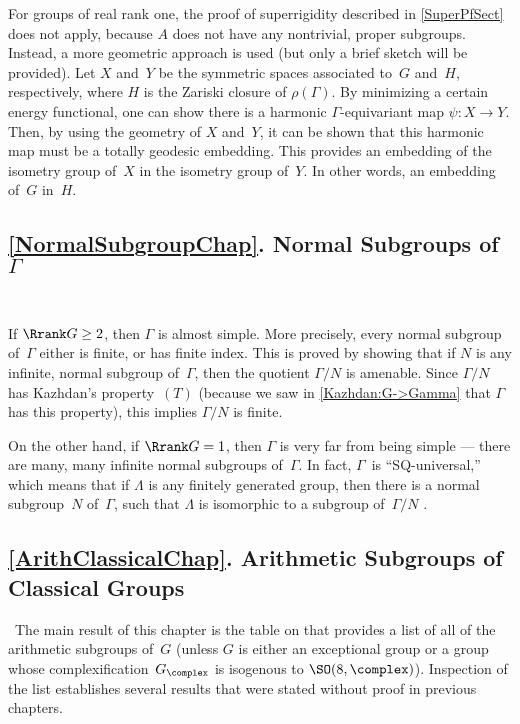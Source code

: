 \smallbreak

 For groups of real rank one, the proof of superrigidity described in \cref{SuperPfSect} does not apply, because $A$ does not have any nontrivial, proper subgroups. Instead, a more geometric approach is used (but only a brief sketch will be provided). Let $X$ and~$Y$ be the symmetric spaces associated to~$G$ and~$H$, respectively, where $H$ is the Zariski closure of $\rho(\Gamma)$. By minimizing a certain energy functional, one can show there is a harmonic $\Gamma$-equivariant map $\psi \colon X \to Y$. Then, by using the geometry of $X$ and~$Y$, it can be shown that this harmonic map must be a totally geodesic embedding. This provides an embedding of the isometry group of~$X$ in the isometry group of~$Y$. In other words, an embedding of~$G$ in~$H$.


\subsection*{\cref{NormalSubgroupChap}. Normal Subgroups of~$\Gamma$} \ 

\smallskip

 If $\Rrank G \ge 2$, then $\Gamma$ is almost simple. More precisely, every normal subgroup of~$\Gamma$ either is finite, or has finite index.
This is proved by showing that if $N$ is any infinite, normal subgroup of~$\Gamma$, then the quotient $\Gamma/N$ is amenable. Since $\Gamma/N$ has Kazhdan's property~$(T)$ (because we saw in \cref{Kazhdan:G->Gamma} that $\Gamma$ has this property), this implies $\Gamma / N$ is finite.

\smallbreak

 On the other hand, if $\Rrank G = 1$, then $\Gamma$ is very far from being simple --- there are many, many infinite normal subgroups of~$\Gamma$. In fact, $\Gamma$~is ``SQ-universal\zz,'' which means that if $\Lambda$ is any finitely generated group, then there is a normal subgroup~$N$ of~$\Gamma$, such that $\Lambda$ is isomorphic to a subgroup of~$\Gamma/N$ .

\goodbreak


\subsection*{\cref{ArithClassicalChap}. Arithmetic Subgroups of Classical Groups} \ 
The main result of this chapter is the table on  that provides a list of all of the arithmetic subgroups of~$G$ (unless $G$ is either an exceptional group or a group whose complexification~$G_\complex$ is isogenous to $\SO(8,\complex)$). Inspection of the list establishes several results that were stated without proof in previous chapters.

